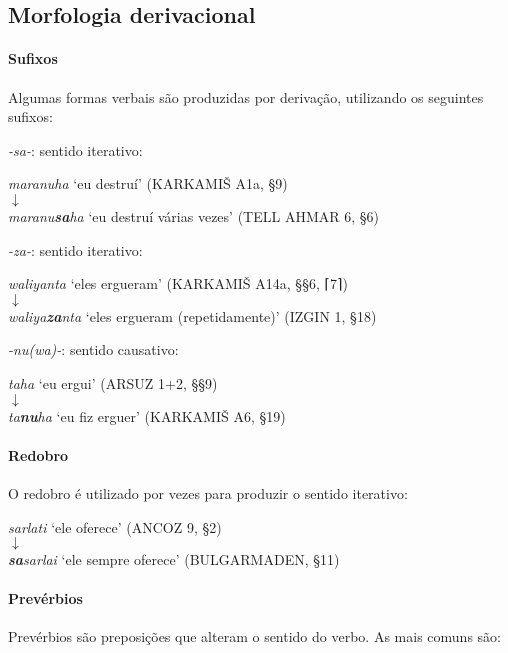\subsection{Morfologia derivacional}

\paragraph{Sufixos}
Algumas formas verbais são produzidas por derivação, utilizando os seguintes
sufixos:
\begin{compactenum}[(a)]
	\item \emph{-sa-}: sentido iterativo:
	\begin{center}
		\emph{maranuha} `eu destruí' (KARKAMIŠ A1a, §9)\\
		$\downarrow$\\
		\emph{maranu\textbf{sa}ha} `eu destruí várias vezes' (TELL AHMAR 6, §6)
	\end{center}
	\item \emph{-za-}: sentido iterativo:
	\begin{center}
		\emph{waliyanta} `eles ergueram' (KARKAMIŠ A14a, §§6, \textsc{⌈}7\textsc{⌉})\\
		$\downarrow$\\
		\emph{waliya\textbf{za}nta} `eles ergueram (repetidamente)' (IZGIN 1, §18)
	\end{center}
	\item \emph{-nu{(wa)}-}: sentido causativo:
	\begin{center}
		\emph{taha} `eu ergui' (ARSUZ 1+2, §§9)\\
		$\downarrow$\\
		\emph{ta\textbf{nu}ha} `eu fiz erguer' (KARKAMIŠ A6, §19)
	\end{center}
\end{compactenum}

\paragraph{Redobro}
O redobro é utilizado por vezes para produzir o sentido iterativo:
\begin{center}
	\emph{sarlati} `ele oferece' (ANCOZ 9, §2)\\
	$\downarrow$\\
	\emph{\textbf{sa}sarlai} `ele sempre oferece' (BULGARMADEN, §11)
\end{center}

\paragraph{Prevérbios}
Prevérbios são preposições que alteram o sentido do verbo.
As mais comuns são:

